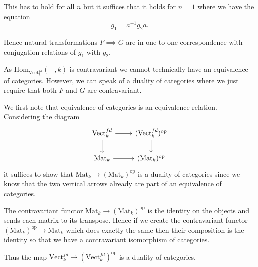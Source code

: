 \documentclass[a4paper]{article}
\begin{document}
\begin{exercise}{2}
\begin{enumerate}[label=(\alph*)]
      This has to hold for all $ n $ but it suffices that it holds for $ n = 1 $ where we have the equation
      \begin{equation*}
      g_1 = a^{-1}g_2 a
      .\end{equation*}

      Hence natural transformations $ F \implies G $ are in one-to-one correspondence with conjugation relations of $ g_1 $ with $ g_2 $.
    \end{enumerate}
  \end{exercise}

  \begin{exercise}{3}
    As $ \text{Hom}_{\text{Vect}_k^{fd}}(-, k) $ is contravariant we cannot technically have an equivalence of categories. However, we can speak of a duality of categories where we just require that both $ F $ and $ G $ are contravariant.

    We first note that equivalence of categories is an equivalence relation. Considering the diagram
    \[\begin{tikzcd}
	    {\text{Vect}_k^{fd}} & {(\text{Vect}_k^{fd})^{\text{op}}} \\
	    {\text{Mat}_k} & {(\text{Mat}_k)^\text{op}}
	    \arrow[from=1-1, to=1-2]
	    \arrow[from=1-1, to=2-1]
	    \arrow[from=1-2, to=2-2]
	    \arrow[from=2-1, to=2-2]
    \end{tikzcd}\]
    it suffices to show that $ \text{Mat}_k \to (\text{Mat}_k)^{\text{op}} $ is a duality of categories since we know that the two vertical arrows already are part of an equivalence of categories.

    The contravariant functor $ \text{Mat}_k \to (\text{Mat}_k)^{\text{op}} $ is the identity on the objects and sends each matrix to its transpose. Hence if we create the contravariant functor $ (\text{Mat}_k)^{\text{op}} \to \text{Mat}_k $ which does exactly the same then their composition is the identity so that we have a contravariant isomorphism of categories.

    Thus the map $ \text{Vect}_k^{fd} \to  (\text{Vect}_k^{fd})^{\text{op}} $ is a duality of categories.
  \end{exercise}
\end{document}

